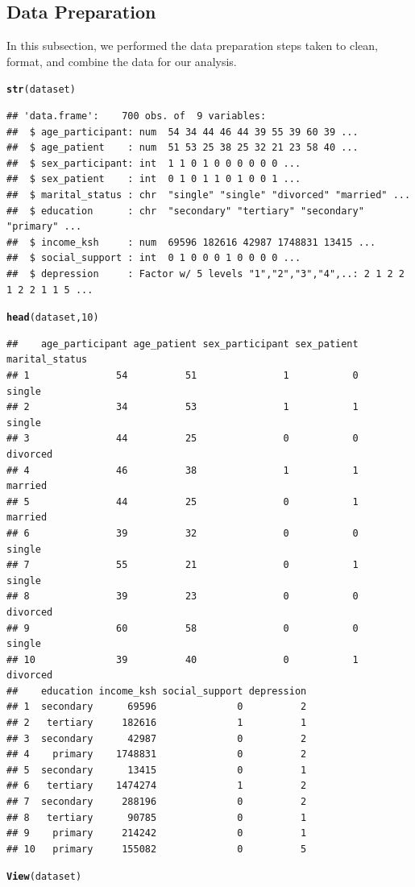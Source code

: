 \documentclass[12pt]{article}\usepackage[]{graphicx}\usepackage[]{xcolor}
\makeatletter
\newcommand{\hlnum}[1]{\textcolor[rgb]{0.686,0.059,0.569}{#1}}%
\newcommand{\hlstd}[1]{\textcolor[rgb]{0.345,0.345,0.345}{#1}}%
\newcommand{\hlkwd}[1]{\textcolor[rgb]{0.737,0.353,0.396}{\textbf{#1}}}%
\newenvironment{kframe}{%
 \def\at@end@of@kframe{}%
 \ifinner\ifhmode%
  \def\at@end@of@kframe{\end{minipage}}%
  \begin{minipage}{\columnwidth}%
 \fi\fi%
 \def\FrameCommand##1{\hskip\@totalleftmargin \hskip-\fboxsep
 \colorbox{shadecolor}{##1}\hskip-\fboxsep
     \hskip-\linewidth \hskip-\@totalleftmargin \hskip\columnwidth}%
 \MakeFramed {\advance\hsize-\width
   \@totalleftmargin\z@ \linewidth\hsize
   \@setminipage}}%
 {\par\unskip\endMakeFramed%
 \at@end@of@kframe}
\newenvironment{knitrout}{}{} %
\numberwithin{equation}{section}
\numberwithin{figure}{section}
\makeatother
\begin{document}
\subsection{Data Preparation}
In this subsection, we performed the data preparation steps taken to clean, format, and combine the data for our analysis.
\begin{knitrout}
\color{fgcolor}\begin{kframe}
\begin{alltt}
\hlkwd{str}\hlstd{(dataset)}
\end{alltt}
\begin{verbatim}
## 'data.frame':	700 obs. of  9 variables:
##  $ age_participant: num  54 34 44 46 44 39 55 39 60 39 ...
##  $ age_patient    : num  51 53 25 38 25 32 21 23 58 40 ...
##  $ sex_participant: int  1 1 0 1 0 0 0 0 0 0 ...
##  $ sex_patient    : int  0 1 0 1 1 0 1 0 0 1 ...
##  $ marital_status : chr  "single" "single" "divorced" "married" ...
##  $ education      : chr  "secondary" "tertiary" "secondary" "primary" ...
##  $ income_ksh     : num  69596 182616 42987 1748831 13415 ...
##  $ social_support : int  0 1 0 0 0 1 0 0 0 0 ...
##  $ depression     : Factor w/ 5 levels "1","2","3","4",..: 2 1 2 2 1 2 2 1 1 5 ...
\end{verbatim}
\begin{alltt}
\hlkwd{head}\hlstd{(dataset,} \hlnum{10}\hlstd{)}
\end{alltt}
\begin{verbatim}
##    age_participant age_patient sex_participant sex_patient marital_status
## 1               54          51               1           0         single
## 2               34          53               1           1         single
## 3               44          25               0           0       divorced
## 4               46          38               1           1        married
## 5               44          25               0           1        married
## 6               39          32               0           0         single
## 7               55          21               0           1         single
## 8               39          23               0           0       divorced
## 9               60          58               0           0         single
## 10              39          40               0           1       divorced
##    education income_ksh social_support depression
## 1  secondary      69596              0          2
## 2   tertiary     182616              1          1
## 3  secondary      42987              0          2
## 4    primary    1748831              0          2
## 5  secondary      13415              0          1
## 6   tertiary    1474274              1          2
## 7  secondary     288196              0          2
## 8   tertiary      90785              0          1
## 9    primary     214242              0          1
## 10   primary     155082              0          5
\end{verbatim}
\begin{alltt}
\hlkwd{View}\hlstd{(dataset)}


\end{alltt}
\end{kframe}
\end{knitrout}
\end{document}
